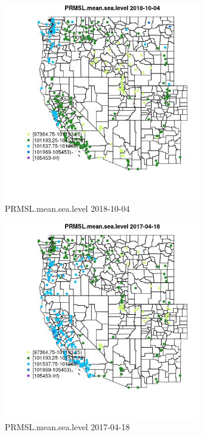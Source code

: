 \begin{figure} 
\centering  
\includegraphics[width=0.77\textwidth]{Code_Outputs/Report_ML_input_PM25_Step4_part_f_de_duplicated_aves_prioritize_24hr_obswNAs_MapObsPRMSLmeansealevel2018-10-04.jpg} 
\caption{\label{fig:Report_ML_input_PM25_Step4_part_f_de_duplicated_aves_prioritize_24hr_obswNAsMapObsPRMSLmeansealevel2018-10-04}PRMSL.mean.sea.level 2018-10-04} 
\end{figure} 
 

\clearpage 

\begin{figure} 
\centering  
\includegraphics[width=0.77\textwidth]{Code_Outputs/Report_ML_input_PM25_Step4_part_f_de_duplicated_aves_prioritize_24hr_obswNAs_MapObsPRMSLmeansealevel2017-04-18.jpg} 
\caption{\label{fig:Report_ML_input_PM25_Step4_part_f_de_duplicated_aves_prioritize_24hr_obswNAsMapObsPRMSLmeansealevel2017-04-18}PRMSL.mean.sea.level 2017-04-18} 
\end{figure} 
 

